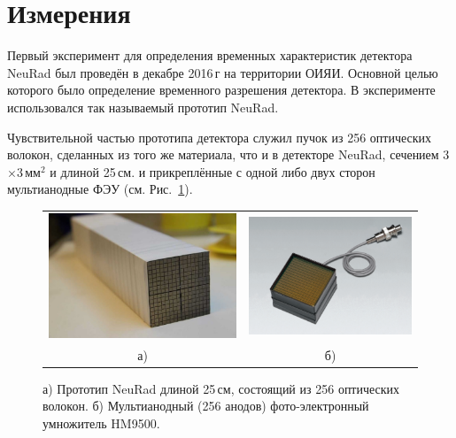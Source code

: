 \section{Измерения}


Первый эксперимент для определения временных характеристик детектора NeuRad был проведён в декабре 2016\,г на территории ОИЯИ. Основной  целью которого было определение временного разрешения детектора. В эксперименте использовался так называемый прототип NeuRad.

Чувствительной частью прототипа детектора служил пучок из 256 оптических волокон, сделанных из того же материала, что и в детекторе NeuRad, сечением 3$\times$3\,мм$^2$ и длиной 25\,см. и прикреплённые с одной либо двух сторон мультианодные ФЭУ (см. Рис.~\ref{ris:neuradfibers}).

\begin{figure}[!ht]
		\centering
		\begin{tabular}{cc}
			\includegraphics[width=0.52\linewidth]{neuradfibers.png} 
			&
			\includegraphics[width=0.48\linewidth]{H9500.png} \\
			а) & б)
		\end{tabular}
		\caption[Short caption for list of figures]{а) Прототип NeuRad длиной 25\,см, состоящий из 256 оптических волокон. б) Мультианодный (256 анодов) фото-электронный умножитель HM9500.}
		\label{ris:neuradfibers}
\end{figure}

